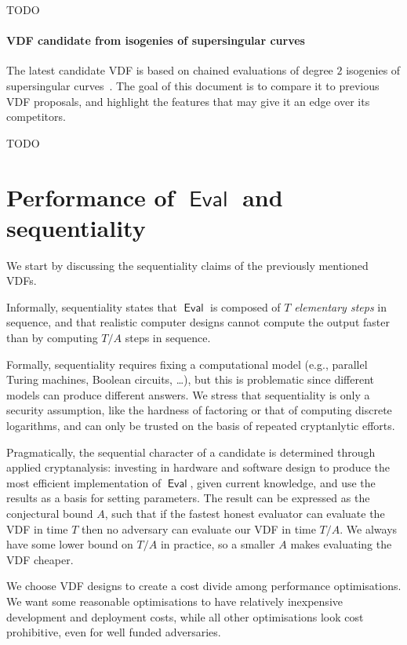 \documentclass{article}
\DeclareMathOperator{\Eval}{\mathsf{Eval}}
\begin{document}
TODO

\paragraph{VDF candidate from isogenies of supersingular curves}
The latest candidate VDF is based on chained evaluations of degree $2$
isogenies of supersingular curves~\cite{cryptoeprint:2019:166}. %
The goal of this document is to compare it to previous VDF proposals,
and highlight the features that may give it an edge over its
competitors.

TODO



\section{Performance of $\Eval$ and sequentiality}
\label{sec:performance}

We start by discussing the sequentiality claims of the previously
mentioned VDFs. %

Informally, sequentiality states that $\Eval$ is composed of $T$
\emph{elementary steps} in sequence, and that realistic computer 
designs cannot compute the output faster than by computing $T/A$
steps in sequence. %

Formally, sequentiality requires fixing a computational model
(e.g., parallel Turing machines, Boolean circuits, \dots), but this
is problematic since different models can produce different answers. 
We stress that sequentiality is only a security assumption, like the
hardness of factoring or that of computing discrete logarithms, and
can only be trusted on the basis of repeated cryptanlytic efforts.

Pragmatically, the sequential character of a candidate is determined
through applied cryptanalysis: investing in hardware and software
design to produce the most efficient implementation of $\Eval$,
given current knowledge, and use the results as a basis for setting
parameters. %
The result can be expressed as the conjectural bound $A$, such that
if the fastest honest evaluator can evaluate the VDF in time $T$ then
no adversary can evaluate our VDF in time $T/A$.  We always have some
lower bound on $T/A$ in practice, so a smaller $A$ makes evaluating
the VDF cheaper.

We choose VDF designs to create a cost divide among performance
optimisations.  We want some reasonable optimisations to have
relatively inexpensive development and deployment costs, while
all other optimisations look cost prohibitive, even for well funded
adversaries.
\end{document}
